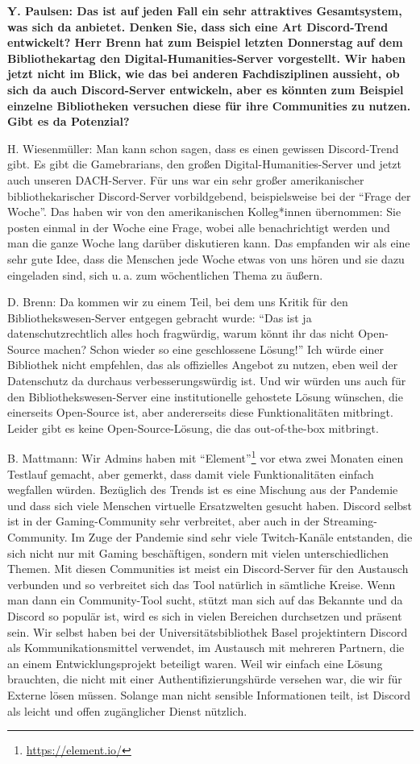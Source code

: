 \documentclass[a4paper,
fontsize=11pt,
oneside,
numbers=noperiodatend,
parskip=half-,
bibliography=totoc,
final
]{scrartcl}
\begin{document}
\textbf{Y. Paulsen: Das ist auf jeden Fall ein sehr attraktives
Gesamtsystem, was sich da anbietet. Denken Sie, dass sich eine Art
Discord-Trend entwickelt? Herr Brenn hat zum Beispiel letzten Donnerstag
auf dem Bibliothekartag den Digital-Humanities-Server vorgestellt. Wir
haben jetzt nicht im Blick, wie das bei anderen Fachdisziplinen
aussieht, ob sich da auch Discord-Server entwickeln, aber es könnten zum
Beispiel einzelne Bibliotheken versuchen diese für ihre Communities zu
nutzen. Gibt es da Potenzial?}

H. Wiesenmüller: Man kann schon sagen, dass es einen gewissen
Discord-Trend gibt. Es gibt die Gamebrarians, den großen
Digital-Humanities-Server und jetzt auch unseren DACH-Server. Für uns
war ein sehr großer amerikanischer bibliothekarischer Discord-Server
vorbildgebend, beispielsweise bei der \enquote{Frage der Woche}. Das
haben wir von den amerikanischen Kolleg*innen übernommen: Sie posten
einmal in der Woche eine Frage, wobei alle benachrichtigt werden und man
die ganze Woche lang darüber diskutieren kann. Das empfanden wir als
eine sehr gute Idee, dass die Menschen jede Woche etwas von uns hören
und sie dazu eingeladen sind, sich u. a. zum wöchentlichen Thema zu
äußern.

D. Brenn: Da kommen wir zu einem Teil, bei dem uns Kritik für den
Bibliothekswesen-Server entgegen gebracht wurde: \enquote{Das ist ja
datenschutzrechtlich alles hoch fragwürdig, warum könnt ihr das nicht
Open-Source machen? Schon wieder so eine geschlossene Lösung!} Ich würde
einer Bibliothek nicht empfehlen, das als offizielles Angebot zu nutzen,
eben weil der Datenschutz da durchaus verbesserungswürdig ist. Und wir
würden uns auch für den Bibliothekswesen-Server eine institutionelle
gehostete Lösung wünschen, die einerseits Open-Source ist, aber
andererseits diese Funktionalitäten mitbringt. Leider gibt es keine
Open-Source-Lösung, die das out-of-the-box mitbringt.

B. Mattmann: Wir Admins haben mit \enquote{Element}\footnote{\url{https://element.io/}} vor etwa
zwei Monaten einen Testlauf gemacht, aber gemerkt, dass damit viele
Funktionalitäten einfach wegfallen würden. Bezüglich des Trends ist es
eine Mischung aus der Pandemie und dass sich viele Menschen virtuelle
Ersatzwelten gesucht haben. Discord selbst ist in der Gaming-Community
sehr verbreitet, aber auch in der Streaming-Community. Im Zuge der
Pandemie sind sehr viele Twitch-Kanäle entstanden, die sich nicht nur
mit Gaming beschäftigen, sondern mit vielen unterschiedlichen Themen.
Mit diesen Communities ist meist ein Discord-Server für den Austausch
verbunden und so verbreitet sich das Tool natürlich in sämtliche Kreise.
Wenn man dann ein Community-Tool sucht, stützt man sich auf das Bekannte
und da Discord so populär ist, wird es sich in vielen Bereichen
durchsetzen und präsent sein. Wir selbst haben bei der
Universitätsbibliothek Basel projektintern Discord als
Kommunikationsmittel verwendet, im Austausch mit mehreren Partnern, die
an einem Entwicklungsprojekt beteiligt waren. Weil wir einfach eine
Lösung brauchten, die nicht mit einer Authentifizierungshürde versehen
war, die wir für Externe lösen müssen. Solange man nicht sensible
Informationen teilt, ist Discord als leicht und offen zugänglicher
Dienst nützlich.
\end{document}
